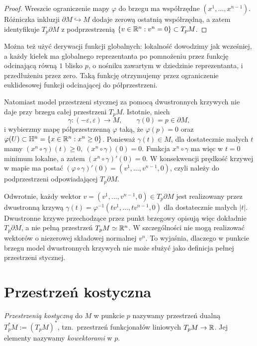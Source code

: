 \begin{proof}
Wreszcie ograniczenie mapy $\varphi$ do brzegu ma współrzędne
$(x^1,\ldots,x^{n-1})$. Różniczka inkluzji
$\partial M\hookrightarrow M$ dodaje zerową ostatnią współrzędną,
a zatem identyfikuje $T_p\partial M$ z podprzestrzenią $\{v\in\mathbb{R}^n:v^n=0\}\subset T_pM$.
\end{proof}

Można też użyć derywacji funkcji globalnych: lokalność dowodzimy
jak wcześniej, a każdy kiełek ma globalnego reprezentanta po
pomnożeniu przez funkcję odcinającą równą $1$ blisko $p$,
o nośniku zawartym w dziedzinie reprezentanta, i przedłużeniu przez zero.
Taką funkcję otrzymujemy przez ograniczenie
euklidesowej funkcji odcinającej do półprzestrzeni.

Natomiast model przestrzeni stycznej za pomocą dwustronnych krzywych
nie daje przy brzegu całej przestrzeni $T_pM$. Istotnie, niech
\[
\gamma:(-\varepsilon,\varepsilon)\to M,
\qquad
\gamma(0)=p\in\partial M,
\]
i wybierzmy mapę półprzestrzenną $\varphi$ taką, że
$\varphi(p)=0$ oraz $\varphi(U)\subset\mathbb H^n = \{x\in\mathbb{R}^n:x^n\geq0\}$.
Ponieważ $\gamma(t)\in M$, dla dostatecznie małych $t$ mamy $(x^n\circ\gamma)(t)\geq0, \ (x^n\circ\gamma)(0)=0$.
Funkcja $x^n\circ\gamma$ ma więc w $t=0$ minimum lokalne, a zatem $(x^n\circ\gamma)'(0)=0$.
W konsekwencji prędkość krzywej w mapie ma postać $(\varphi\circ\gamma)'(0) = (v^1,\ldots,v^{n-1},0)$,
czyli należy do podprzestrzeni odpowiadającej
$T_p\partial M$.

Odwrotnie, każdy wektor $v=(v^1,\ldots,v^{n-1},0)\in T_p\partial M$
jest realizowany przez dwustronną krzywą $\gamma(t) = \varphi^{-1}(tv^1,\ldots,tv^{n-1},0)$
dla dostatecznie małych $|t|$. Dwustronne krzywe przechodzące przez
punkt brzegowy opisują więc dokładnie $T_p\partial M$, a nie pełną
przestrzeń $T_pM\simeq\mathbb{R}^n$.
W szczególności nie mogą realizować wektorów o niezerowej składowej
normalnej $v^n$. To wyjaśnia, dlaczego w punkcie brzegu model
dwustronnych krzywych nie może służyć jako definicja pełnej przestrzeni
stycznej.

\section{Przestrzeń kostyczna}\label{sec:przestrzen-kostyczna}

\begin{definicja}
\emph{Przestrzenią kostyczną} do $M$ w punkcie $p$ nazywamy przestrzeń dualną
$T_p^*M:=(T_pM)^*$, tzn.\ przestrzeń funkcjonałów liniowych $T_pM\to\mathbb{R}$. Jej elementy
nazywamy \emph{kowektorami} w $p$.
\end{definicja}

